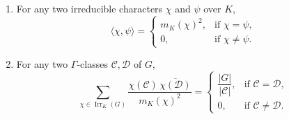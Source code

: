\begin{thm}
\label{thm:orth}
\begin{enumerate}
\item For any two irreducible characters \(\chi\) and \(\psi\) over $K$,
\[
\langle \chi, \psi \rangle =
\begin{cases}
m_K(\chi)^2, & \text{if } \chi = \psi, \\
0, & \text{if } \chi \neq \psi.
\end{cases}
\]
\item For any two \(\Gamma\)-classes \(\mathcal{C}, \mathcal{D}\) of \(G\),
\[
\sum_{\chi \in \operatorname{Irr}_K(G)}
\frac{\chi(\mathcal{C}) \, \overline{\chi(\mathcal{D})}}{m_K(\chi)^2}
=
\begin{cases}
\dfrac{|G|}{|\mathcal{C}|}, & \text{if } \mathcal{C} = \mathcal{D}, \\[6pt]
0, & \text{if } \mathcal{C} \neq \mathcal{D}.
\end{cases}
\]

\end{enumerate}

\end{thm}
